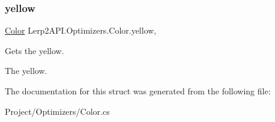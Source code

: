 \subsubsection{\texorpdfstring{yellow}{yellow}}
{\footnotesize\ttfamily \hyperlink{struct_lerp2_a_p_i_1_1_optimizers_1_1_color}{Color} Lerp2\+A\+P\+I.\+Optimizers.\+Color.\+yellow\hspace{0.3cm}{\ttfamily [static]}, {\ttfamily [get]}}



Gets the yellow. 

The yellow.

The documentation for this struct was generated from the following file\+:\begin{DoxyCompactItemize}
\item 
Project/\+Optimizers/Color.\+cs\end{DoxyCompactItemize}
